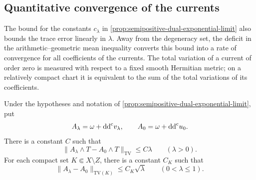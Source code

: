 \subsection{Quantitative convergence of the currents}

The bound for the constants $c_\lambda$ in \cref{prop:semipositive-dual-exponential-limit} also bounds the trace error linearly in $\lambda$. Away from the degeneracy set, the deficit in the arithmetic--geometric mean inequality converts this bound into a rate of convergence for all coefficients of the currents. The total variation of a current of order zero is measured with respect to a fixed smooth Hermitian metric; on a relatively compact chart it is equivalent to the sum of the total variations of its coefficients.

\begin{proposition}\label{prop:semipositive-dual-current-rate}
Under the hypotheses and notation of \cref{prop:semipositive-dual-exponential-limit}, put
\[
 A_\lambda=\omega+\mathrm{dd}^{\mathrm{c}} v_\lambda,\qquad
 A_0=\omega+\mathrm{dd}^{\mathrm{c}} u_0.
\]
There is a constant $C$ such that
\[
 \|A_\lambda\wedge T-A_0\wedge T\|_{\mathrm{TV}}
       \leq C\lambda\qquad(\lambda>0).
\]
For each compact set $K\Subset X\setminus Z$, there is a constant $C_K$ such that
\[
 \|A_\lambda-A_0\|_{\mathrm{TV}(K)}
       \leq C_K\sqrt\lambda\qquad(0<\lambda\leq1).
\]
\end{proposition}
